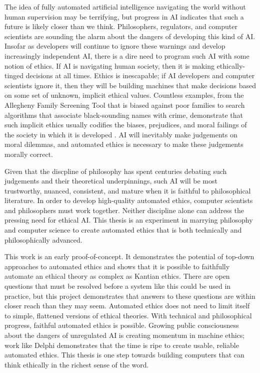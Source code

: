 \begin{isabellebody}
\begin{isamarkuptext}
The idea of fully automated artificial intelligence navigating the world without human supervision
may be terrifying, but progress in AI indicates that such a future is likely closer than we think. 
Philosophers, regulators, and computer scientists are sounding the alarm about the dangers of developing
this kind of AI. Insofar as developers will continue to ignore these warnings and develop increasingly 
independent AI, there is a dire need to program such AI with some notion of ethics. If AI is navigating
human society, then it is making ethically-tinged decisions at all times. Ethics is inescapable; 
if AI developers and computer scientists ignore it, then they will be building machines that make decisions
based on some set of unknown, implicit ethical values. Countless examples, from the Allegheny Family Screening Tool
that is biased against poor families to search algorithms that associate black-sounding names
with crime, demonstrate that such implicit ethics usually codifies the biases, prejudices, and moral
failings of the society in which it is developed \citep{eubanks, sweeney}. AI will inevitably make judgements on moral dilemmas, 
and automated ethics is necessary to make these judgements morally correct. 

Given that the discpline of philosophy has spent centuries debating such judgements and their theoretical 
underpinnings, such AI will be most trustworthy, nuanced, consistent, and mature when it is faithful to 
philosophical literature. In order to develop high-quality automated ethics, computer scientists and 
philosophers must work together. Neither discipline alone can address the pressing need for ethical AI. 
This thesis is an experiment in marrying philosophy and computer science 
to create automated ethics that is both technically and philosophically advanced. 

This work is an early proof-of-concept. It demonstrates the potential of top-down
approaches to automated ethics and shows that it is possible to faithfully automate an ethical theory as
complex as Kantian ethics. There are open questions that must be resolved before a system like this 
could be used in practice, but this project demonstrates that answers to these questions are within closer reach
than they may seem. Automated ethics does not need to limit itself to simple, flattened versions of 
ethical theories. With technical and philosophical progress, faithful automated ethics is possible.
Growing public consciousness about the dangers of unregulated AI is creating momentum in machine ethics; 
work like Delphi demonstrates that the time is ripe to create usable, reliable automated ethics. This 
thesis is one step towards building computers that can think ethically in the richest sense of the word.%
\end{isamarkuptext}\isamarkuptrue%
%
\isadelimtheory
%
\endisadelimtheory
%
\isatagtheory
%
\endisatagtheory
{\isafoldtheory}%
%
\isadelimtheory
%
\endisadelimtheory
%
\end{isabellebody}%
